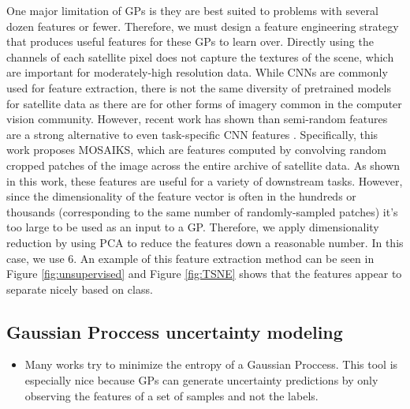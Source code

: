 \begin{itemize}
    One major limitation of GPs is they are best suited to problems with several dozen features or fewer. Therefore, we must design a feature engineering strategy that produces useful features for these GPs to learn over. Directly using the channels of each satellite pixel does not capture the textures of the scene, which are important for moderately-high resolution data. While CNNs are commonly used for feature extraction, there is not the same diversity of pretrained models for satellite data as there are for other forms of imagery common in the computer vision community. However, recent work has shown than semi-random features are a strong alternative to even task-specific CNN features \cite{Rolf2021}. Specifically, this work proposes MOSAIKS, which are features computed by convolving random cropped patches of the image across the entire archive of satellite data. As shown in this work, these features are useful for a variety of downstream tasks. However, since the dimensionality of the feature vector is often in the hundreds or thousands (corresponding to the same number of randomly-sampled patches) it's too large to be used as an input to a GP. Therefore, we apply dimensionality reduction by using PCA to reduce the features down a reasonable number. In this case, we use 6. An example of this feature extraction method can be seen in Figure \ref{fig:unsupervised} and Figure \ref{fig:TSNE} shows that the features appear to separate nicely based on class.


    
\end{itemize}
\subsection{Gaussian Proccess uncertainty modeling}
\begin{itemize}
    \item Many works try to minimize the entropy of a Gaussian Proccess. This tool is especially nice because GPs can generate uncertainty predictions by only observing the features of a set of samples and not the labels.
\end{itemize}
